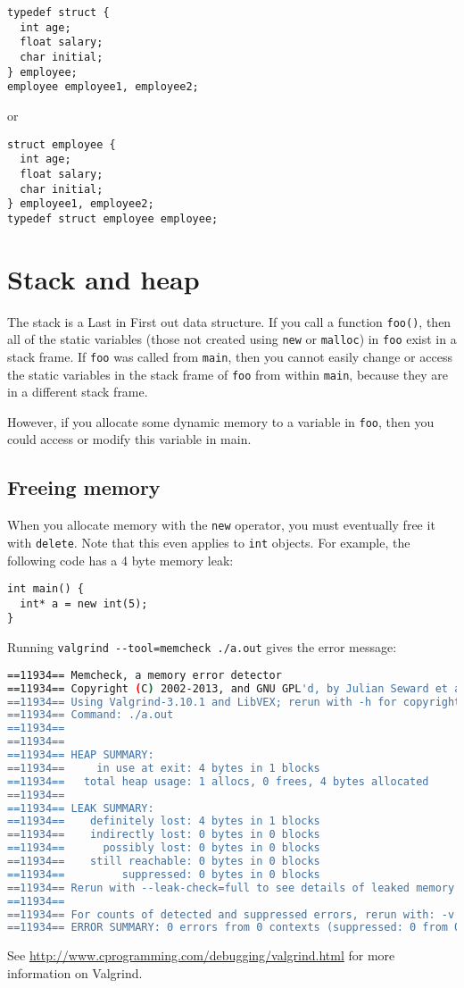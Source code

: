 \documentclass[a4paper,12pt,oneside]{book}
\begin{document}
\begin{lstlisting}
typedef struct {
  int age;
  float salary;
  char initial;
} employee;
employee employee1, employee2;
\end{lstlisting}

or

\begin{lstlisting}
struct employee {
  int age;
  float salary;
  char initial;
} employee1, employee2;
typedef struct employee employee;
\end{lstlisting}
\section{Stack and heap}
The stack is a Last in First out data structure. If you call a function \lstinline|foo()|, then all of the static variables (those not created using \lstinline|new| or \lstinline|malloc|) in \lstinline|foo| exist in a stack frame. If \lstinline|foo| was called from \lstinline|main|, then you cannot easily change or access the static variables in the stack frame of \lstinline|foo| from within \lstinline|main|, because they are in a different stack frame.

However, if you allocate some dynamic memory to a variable in \lstinline|foo|, then you could access or modify this variable in main.
\subsection{Freeing memory}
When you allocate memory with the \lstinline|new| operator, you must eventually free it with \lstinline|delete|. Note that this even applies to \lstinline|int| objects. For example, the following code has a 4 byte memory leak:

\begin{lstlisting}[caption={Memory leak}]
int main() {
  int* a = new int(5);
}
\end{lstlisting}

Running \lstinline|valgrind --tool=memcheck ./a.out| gives the error message:
\begin{lstlisting}[language=bash, caption={Valgrind output}]
==11934== Memcheck, a memory error detector
==11934== Copyright (C) 2002-2013, and GNU GPL'd, by Julian Seward et al.
==11934== Using Valgrind-3.10.1 and LibVEX; rerun with -h for copyright info
==11934== Command: ./a.out
==11934== 
==11934== 
==11934== HEAP SUMMARY:
==11934==     in use at exit: 4 bytes in 1 blocks
==11934==   total heap usage: 1 allocs, 0 frees, 4 bytes allocated
==11934== 
==11934== LEAK SUMMARY:
==11934==    definitely lost: 4 bytes in 1 blocks
==11934==    indirectly lost: 0 bytes in 0 blocks
==11934==      possibly lost: 0 bytes in 0 blocks
==11934==    still reachable: 0 bytes in 0 blocks
==11934==         suppressed: 0 bytes in 0 blocks
==11934== Rerun with --leak-check=full to see details of leaked memory
==11934== 
==11934== For counts of detected and suppressed errors, rerun with: -v
==11934== ERROR SUMMARY: 0 errors from 0 contexts (suppressed: 0 from 0)
\end{lstlisting}
See \url{http://www.cprogramming.com/debugging/valgrind.html} for more information on Valgrind.
\end{document}
